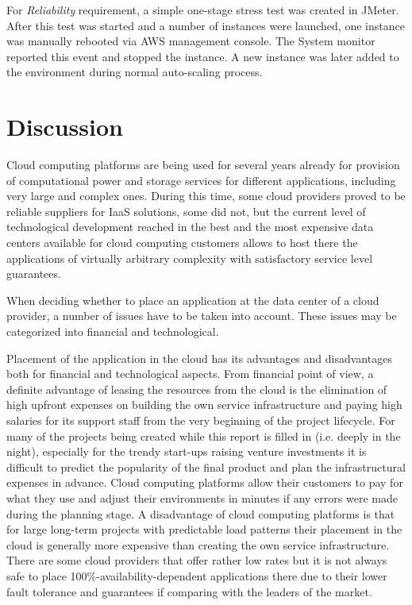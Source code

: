 \documentclass[conference]{IEEEtran}
\begin{document}
For \emph{Reliability} requirement, a simple one-stage stress test was created in JMeter. After this test was started and a number of instances were launched, one instance was manually rebooted via AWS management console. The System monitor reported this event and stopped the instance. A new instance was later added to the environment during normal auto-scaling process.

\section{Discussion}

Cloud computing platforms are being used for several years already for provision of computational power and storage services for different applications, including very large and complex ones. During this time, some cloud providers proved to be reliable suppliers for IaaS solutions, some did not, but the current level of technological development reached in the best and the most expensive data centers available for cloud computing customers allows to host there the applications of virtually arbitrary complexity with satisfactory service level guarantees. 

When deciding whether to place an application at the data center of a cloud provider, a number of issues have to be taken into account. These issues may be categorized into financial and technological. 

Placement of the application in the cloud has its advantages and disadvantages both for financial and technological aspects. From financial point of view, a definite advantage of leasing the resources from the cloud is the elimination of high upfront expenses on building the own service infrastructure and paying high salaries for its support staff from the very beginning of the project lifecycle. For many of the projects being created while this report is filled in (i.e. deeply in the night), especially for the trendy start-ups raising venture investments it is difficult to predict the popularity of the final product and plan the infrastructural expenses in advance. Cloud computing platforms allow their customers to pay for what they use and adjust their environments in minutes if any errors were made during the planning stage. A disadvantage of cloud computing platforms is that for large long-term projects with predictable load patterns their placement in the cloud is generally more expensive than creating the own service infrastructure. There are some cloud providers that offer rather low rates but it is not always safe to place 100\%-availability-dependent applications there due to their lower fault tolerance and guarantees if comparing with the leaders of the market.
\end{document}
